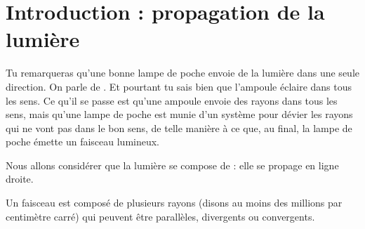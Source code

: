 

\section*{Introduction : propagation de la lumière}

Tu remarqueras qu'une bonne lampe de poche envoie de la lumière dans une seule direction. On parle de . Et pourtant tu sais bien que l'ampoule éclaire dans tous les sens. Ce qu'il se passe est qu'une ampoule envoie des rayons dans tous les sens, mais qu'une lampe de poche est munie d'un système pour dévier les rayons qui ne vont pas dans le bon sens, de telle manière à ce que, au final, la lampe de poche émette un faisceau lumineux.

Nous allons considérer que la lumière se compose de  : elle se propage en ligne droite. 

Un faisceau est composé de plusieurs rayons (disons au moins des millions par centimètre carré) qui peuvent être parallèles, divergents ou convergents.

\newcommand{\prefigoptfaisc}{%
\pstGeonode(0,-0.3){dA}(3,-0.3){fA}
\pstGeonode(0,0){dB}(3,0){fB}
\pstGeonode(0,0.3){dC}(3,0.3){fC}
}

